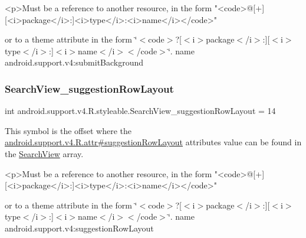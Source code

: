 \begin{DoxyVerb}      <p>Must be a reference to another resource, in the form "<code>@[+][<i>package</i>:]<i>type</i>:<i>name</i></code>"
\end{DoxyVerb}
 or to a theme attribute in the form \char`\"{}$<$code$>$?\mbox{[}$<$i$>$package$<$/i$>$\+:\mbox{]}\mbox{[}$<$i$>$type$<$/i$>$\+:\mbox{]}$<$i$>$name$<$/i$>$$<$/code$>$\char`\"{}.  name android.\+support.\+v4\+:submit\+Background \mbox{\label{classandroid_1_1support_1_1v4_1_1R_1_1styleable_a8f88c91f413bd187e3c108b18f21cd8c}} 
\subsubsection{\texorpdfstring{Search\+View\+\_\+suggestion\+Row\+Layout}{SearchView\_suggestionRowLayout}}
{\footnotesize\ttfamily int android.\+support.\+v4.\+R.\+styleable.\+Search\+View\+\_\+suggestion\+Row\+Layout = 14\hspace{0.3cm}{\ttfamily [static]}}

This symbol is the offset where the \hyperlink{classandroid_1_1support_1_1v4_1_1R_1_1attr_a665c196172c2b516ee034b8ef773a9a0}{android.\+support.\+v4.\+R.\+attr\#suggestion\+Row\+Layout} attribute\textquotesingle{}s value can be found in the \hyperlink{classandroid_1_1support_1_1v4_1_1R_1_1styleable_a7f709410d566e9fd5d4c710e815c300a}{Search\+View} array.

\begin{DoxyVerb}      <p>Must be a reference to another resource, in the form "<code>@[+][<i>package</i>:]<i>type</i>:<i>name</i></code>"
\end{DoxyVerb}
 or to a theme attribute in the form \char`\"{}$<$code$>$?\mbox{[}$<$i$>$package$<$/i$>$\+:\mbox{]}\mbox{[}$<$i$>$type$<$/i$>$\+:\mbox{]}$<$i$>$name$<$/i$>$$<$/code$>$\char`\"{}.  name android.\+support.\+v4\+:suggestion\+Row\+Layout \mbox{\label{classandroid_1_1support_1_1v4_1_1R_1_1styleable_af3c725a4fd59183d49fcefdca539db7a}} 
